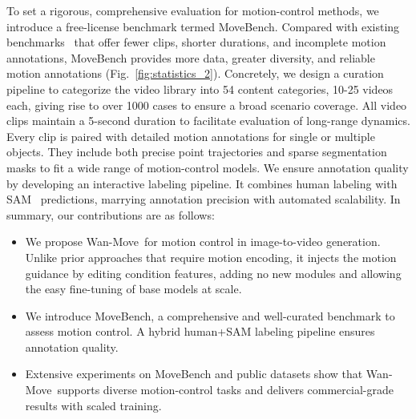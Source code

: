 \documentclass{article}
\newcommand{\method}{Wan-Move}
\begin{document}
To set a rigorous, comprehensive evaluation for motion-control methods, we introduce a free-license benchmark termed MoveBench.
Compared with existing benchmarks~\cite{li2025magicmotion,pont2017davis,miao2022vipseg} that offer fewer clips, shorter durations, and incomplete motion annotations, MoveBench provides more data, greater diversity, and reliable motion annotations (Fig.~\ref{fig:statistics_2}).
Concretely, we design a curation pipeline to categorize the video library into 54 content categories, 10-25 videos each, giving rise to over 1000 cases to ensure a broad scenario coverage.
All video clips maintain a 5-second duration to facilitate evaluation of long-range dynamics.
Every clip is paired with detailed motion annotations for single or multiple objects. They include both precise point trajectories and sparse segmentation masks to fit a wide range of motion-control models.
We ensure annotation quality by developing an interactive labeling pipeline. It combines human labeling with SAM~\cite{sam} predictions, marrying annotation precision with automated scalability.
In summary, our contributions are as follows: 
\begin{itemize}
\item We propose \method~for motion control in image-to-video generation. Unlike prior approaches that require motion encoding, it injects the motion guidance by editing condition features, adding no new modules and allowing the easy fine-tuning of base models at scale.

\item We introduce MoveBench, a comprehensive and well-curated benchmark to assess motion control. A hybrid human+SAM labeling pipeline ensures annotation quality.

\item Extensive experiments on MoveBench and public datasets show that \method~supports diverse motion-control tasks and delivers commercial-grade results with scaled training.
\end{itemize}
\end{document}
